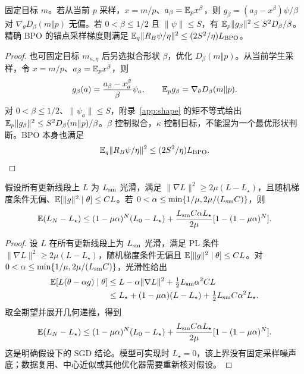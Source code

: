 \begin{proposition}[拟合形状与残差二阶矩]
固定目标 $m$。若从当前 $p$ 采样，$x=m/p$、$a_\beta=\mathbb E_px^\beta$，则 $g_\beta=(a_\beta-x^\beta)\psi/\beta$ 对 $\nabla_\theta D_\beta(m\Vert p)$ 无偏。若 $0<\beta\le1/2$ 且 $\|\psi\|\le S$，有 $\mathbb E_p\|g_\beta\|^2\le S^2D_\beta/\beta$。精确 BPO 的锚点采样梯度则满足 $\mathbb E_q\|R_B\psi/\eta\|^2\le(2S^2/\eta)L_{\rm BPO}$。
\end{proposition}
\begin{proof}
也可固定目标 $m_{\kappa,\eta}$ 后另选拟合形状 $\beta$，优化 $D_\beta(m\Vert p)$。从当前学生采样，令 $x=m/p$、$a_\beta=\mathbb E_px^\beta$，则
\begin{equation}
g_\beta(a)=\frac{a_\beta-x_a^\beta}{\beta}\psi_a,\qquad
\mathbb E_pg_\beta=\nabla_\theta D_\beta(m\Vert p).
\end{equation}
对 $0<\beta\le1/2$、$\|\psi_a\|\le S$，附录~\ref{app:shape} 的矩不等式给出 $\mathbb E_p\|g_\beta\|^2\le S^2D_\beta(m\Vert p)/\beta$。$\beta$ 控制拟合，$\kappa$ 控制目标，不能混为一个最优形状判断。BPO 本身也满足
\begin{equation}
\mathbb E_q\|R_B\psi/\eta\|^2\le(2S^2/\eta)L_{\rm BPO}.
\end{equation}
\end{proof}

\begin{theorem}
假设所有更新线段上 $L$ 为 $L_{\rm sm}$ 光滑，满足 $\|\nabla L\|^2\ge2\mu(L-L_\star)$，且随机梯度条件无偏、$\mathbb E[\|g\|^2\mid\theta]\le CL$。若 $0<\alpha\le\min\{1/\mu,2\mu/(L_{\rm sm}C)\}$，则
\begin{equation}
\mathbb E(L_N-L_\star)\le(1-\mu\alpha)^N(L_0-L_\star)
+\frac{L_{\rm sm}C\alpha L_\star}{2\mu}[1-(1-\mu\alpha)^N].
\end{equation}
\end{theorem}
\begin{proof}
设 $L$ 在所有更新线段上为 $L_{\rm sm}$ 光滑，满足 PL 条件 $\|\nabla L\|^2\ge2\mu(L-L_\star)$，随机梯度条件无偏且 $\mathbb E[\|g\|^2\mid\theta]\le CL$。对 $0<\alpha\le\min\{1/\mu,2\mu/(L_{\rm sm}C)\}$，光滑性给出
\begin{align}
\mathbb E[L(\theta-\alpha g)\mid\theta]
&\le L-\alpha\|\nabla L\|^2+\tfrac12L_{\rm sm}\alpha^2CL\\
&\le L_\star+(1-\mu\alpha)(L-L_\star)
+\tfrac12L_{\rm sm}C\alpha^2L_\star.
\end{align}
取全期望并展开几何递推，得到
\begin{equation}
\mathbb E(L_N-L_\star)\le(1-\mu\alpha)^N(L_0-L_\star)
+\frac{L_{\rm sm}C\alpha L_\star}{2\mu}[1-(1-\mu\alpha)^N].
\end{equation}
这是明确假设下的 SGD 结论。模型可实现时 $L_\star=0$，该上界没有固定采样噪声底；数据复用、中心近似或其他优化器需要重新核对假设。
\end{proof}

